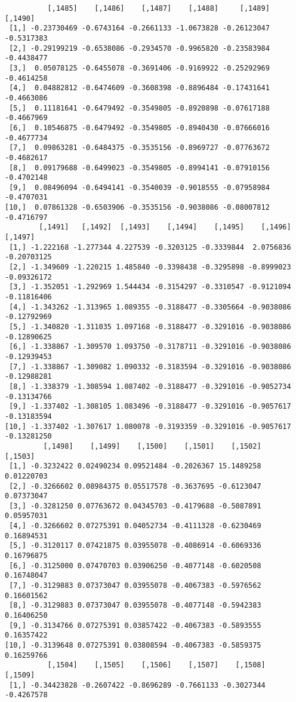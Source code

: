 \documentclass[
  letterpaper,
  DIV=11,
  numbers=noendperiod]{scrreprt}
\begin{document}
\begin{verbatim}
          [,1485]    [,1486]    [,1487]    [,1488]     [,1489]    [,1490]
 [1,] -0.23730469 -0.6743164 -0.2661133 -1.0673828 -0.26123047 -0.5317383
 [2,] -0.29199219 -0.6538086 -0.2934570 -0.9965820 -0.23583984 -0.4438477
 [3,]  0.05078125 -0.6455078 -0.3691406 -0.9169922 -0.25292969 -0.4614258
 [4,]  0.04882812 -0.6474609 -0.3608398 -0.8896484 -0.17431641 -0.4663086
 [5,]  0.11181641 -0.6479492 -0.3549805 -0.8920898 -0.07617188 -0.4667969
 [6,]  0.10546875 -0.6479492 -0.3549805 -0.8940430 -0.07666016 -0.4677734
 [7,]  0.09863281 -0.6484375 -0.3535156 -0.8969727 -0.07763672 -0.4682617
 [8,]  0.09179688 -0.6499023 -0.3549805 -0.8994141 -0.07910156 -0.4702148
 [9,]  0.08496094 -0.6494141 -0.3540039 -0.9018555 -0.07958984 -0.4707031
[10,]  0.07861328 -0.6503906 -0.3535156 -0.9038086 -0.08007812 -0.4716797
        [,1491]   [,1492]  [,1493]    [,1494]    [,1495]    [,1496]     [,1497]
 [1,] -1.222168 -1.277344 4.227539 -0.3203125 -0.3339844  2.0756836 -0.20703125
 [2,] -1.349609 -1.220215 1.485840 -0.3398438 -0.3295898 -0.8999023 -0.09326172
 [3,] -1.352051 -1.292969 1.544434 -0.3154297 -0.3310547 -0.9121094 -0.11816406
 [4,] -1.343262 -1.313965 1.089355 -0.3188477 -0.3305664 -0.9038086 -0.12792969
 [5,] -1.340820 -1.311035 1.097168 -0.3188477 -0.3291016 -0.9038086 -0.12890625
 [6,] -1.338867 -1.309570 1.093750 -0.3178711 -0.3291016 -0.9038086 -0.12939453
 [7,] -1.338867 -1.309082 1.090332 -0.3183594 -0.3291016 -0.9038086 -0.12988281
 [8,] -1.338379 -1.308594 1.087402 -0.3188477 -0.3291016 -0.9052734 -0.13134766
 [9,] -1.337402 -1.308105 1.083496 -0.3188477 -0.3291016 -0.9057617 -0.13183594
[10,] -1.337402 -1.307617 1.080078 -0.3193359 -0.3291016 -0.9057617 -0.13281250
         [,1498]    [,1499]    [,1500]    [,1501]    [,1502]    [,1503]
 [1,] -0.3232422 0.02490234 0.09521484 -0.2026367 15.1489258 0.01220703
 [2,] -0.3266602 0.08984375 0.05517578 -0.3637695 -0.6123047 0.07373047
 [3,] -0.3281250 0.07763672 0.04345703 -0.4179688 -0.5087891 0.05957031
 [4,] -0.3266602 0.07275391 0.04052734 -0.4111328 -0.6230469 0.16894531
 [5,] -0.3120117 0.07421875 0.03955078 -0.4086914 -0.6069336 0.16796875
 [6,] -0.3125000 0.07470703 0.03906250 -0.4077148 -0.6020508 0.16748047
 [7,] -0.3129883 0.07373047 0.03955078 -0.4067383 -0.5976562 0.16601562
 [8,] -0.3129883 0.07373047 0.03955078 -0.4077148 -0.5942383 0.16406250
 [9,] -0.3134766 0.07275391 0.03857422 -0.4067383 -0.5893555 0.16357422
[10,] -0.3139648 0.07275391 0.03808594 -0.4067383 -0.5859375 0.16259766
          [,1504]    [,1505]    [,1506]    [,1507]    [,1508]    [,1509]
 [1,] -0.34423828 -0.2607422 -0.8696289 -0.7661133 -0.3027344 -0.4267578

\end{verbatim}
\end{document}
